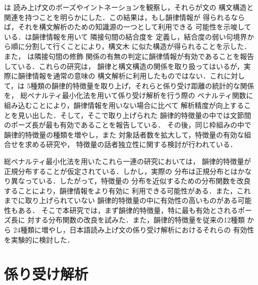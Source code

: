 \cite{UYE}は
読み上げ文のポーズやイントネーションを観察し，それらが文の
構文構造と関連を持つことを明らかにした．この結果は，もし韻律情報が
得られるならば，それを構文解析のための知識源の一つとして利用できる
可能性を示唆している．\cite{KOM}は韻律情報を用いて
隣接句間の結合度を
定義し，結合度の弱い句境界から順に分割して行くことにより，構文木
に似た構造が得られることを示した．また，
\cite{SEK}は隣接句間の修飾
関係の有無の判定に韻律情報が有効であることを報告している．これらの研究は，
韻律と構文構造の関係を取り扱ってはいるが，実際に韻律情報を通常の意味の
構文解析に利用したものではない．これに対して，\cite{EGU}は
5種類の韻律的特徴量を取り上げ，それらと係り受け距離の統計的な関係を，
総ペナルティ最小化法\cite{OZE-1}を用いて係り受け解析を行う際の
ペナルティ関数に組み込むことにより，韻律情報を用いない場合に比べて
解析精度が向上することを見い出した．そして，そこで取り上げられた
韻律的特徴量の中では文節間のポーズ長が最も有効であることを報告している．
その後，同じ枠組みの中で韻律的特徴量の種類を増やし，また
対象話者数を拡大して，特徴量の有効な組合せを求める研究や，
特徴量の話者独立性に関する検討が行われている\cite{KOU-1,OZE-2,OZE-3,OZE-4}．

総ペナルティ最小化法を用いたこれら一連の研究においては，
韻律的特徴量が正規分布することが仮定されている．しかし，実際の
分布は正規分布とはかなり異なっている．したがって，特徴量の
分布を近似するための分布関数を改良することにより，韻律情報をより有効に
利用できる可能性がある．また，これまでに取り上げられていない
韻律的特徴量の中に有効性の高いものがある可能性もある．
そこで本研究では，まず韻律的特徴量，特に最も有効とされるポーズ長に
対する分布関数の改良を試みた．また，韻律的特徴量を従来の12種類
\cite{OZE-4}から
24種類に増やし，日本語読み上げ文の係り受け解析におけるそれらの
有効性を実験的に検討した\cite{HIR}．

\section{係り受け解析}

